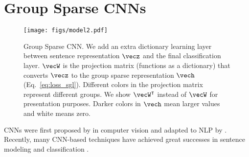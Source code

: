 \section{Group Sparse CNNs}
\label{sec:GSCNN}


\begin{figure*}
\centering
\texttt{[image: figs/model2.pdf]}
\caption{Group Sparse CNN. We add an extra dictionary learning layer between sentence representation $\vecz$ and the final classification layer. 
$\vecW$ is the projection matrix (functions as a dictionary) 
that converts $\vecz$ to the group sparse representation $\vech$ (Eq.~\ref{eq:loss_sgl}).
Different colors in the projection matrix represent different groups. 
We show $\vecW^\intercal$ instead of $\vecW$ for presentation purposes. 
Darker colors in $\vech$ mean larger values and white means zero.}
\label{fig:model}
\end{figure*}







CNNs were first proposed by  in computer vision and
adapted to NLP by \cite{collobert+:2011}.
Recently, many CNN-based techniques have
achieved great successes in sentence modeling and classification
\cite{kim:2014,blunsom:2014}.




